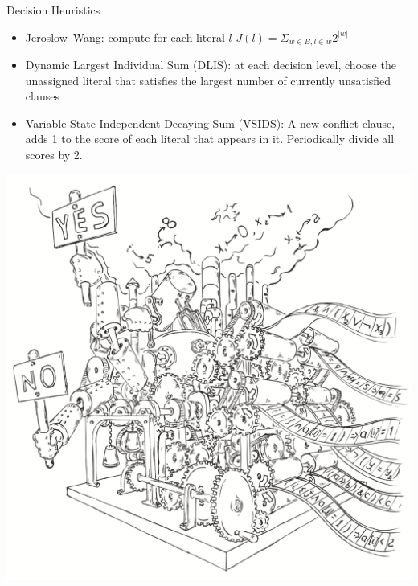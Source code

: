 \documentclass{beamer}
\begin{document}
\begin{frame}{Decision Heuristics}
\begin{itemize}
\item Jeroslow–Wang: compute for each literal $l$\newline
$J(l) = \Sigma_{w \in B, l \in w}2^{|w|}$
\item Dynamic Largest Individual Sum (DLIS): at each decision level, choose the unassigned literal that satisfies the largest number of currently unsatisfied clauses
\item Variable State Independent Decaying Sum (VSIDS): A new conflict clause, adds 1 to the score of each literal that appears in it. Periodically divide all scores by 2.
\end{itemize}
\end{frame}

\begin{frame}
\includegraphics[scale=0.5]{../decision-procedure.png}
\end{frame}
\end{document}
